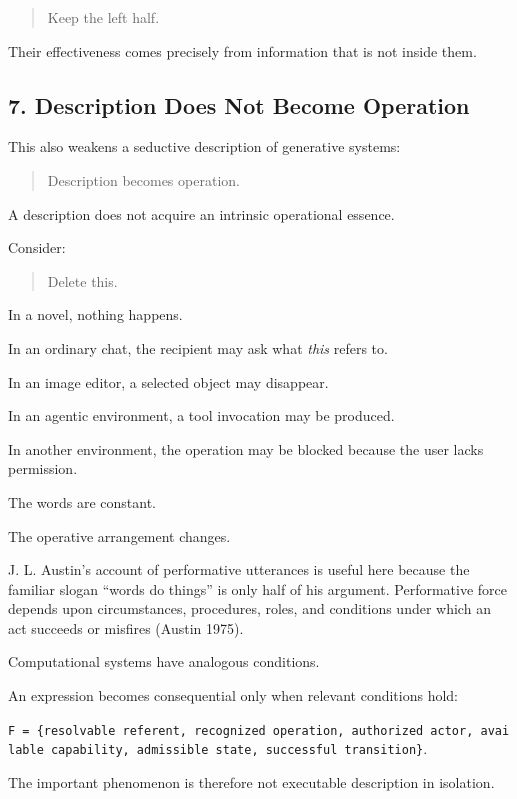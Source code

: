 \documentclass[
]{article}
\begin{document}
\begin{quote}
Keep the left half.
\end{quote}

Their effectiveness comes precisely from information that is not inside
them.

\subsection{7. Description Does Not Become
Operation}\label{description-does-not-become-operation}

This also weakens a seductive description of generative systems:

\begin{quote}
Description becomes operation.
\end{quote}

A description does not acquire an intrinsic operational essence.

Consider:

\begin{quote}
Delete this.
\end{quote}

In a novel, nothing happens.

In an ordinary chat, the recipient may ask what \emph{this} refers to.

In an image editor, a selected object may disappear.

In an agentic environment, a tool invocation may be produced.

In another environment, the operation may be blocked because the user
lacks permission.

The words are constant.

The operative arrangement changes.

J. L. Austin's account of performative utterances is useful here because
the familiar slogan ``words do things'' is only half of his argument.
Performative force depends upon circumstances, procedures, roles, and
conditions under which an act succeeds or misfires (Austin 1975).

Computational systems have analogous conditions.

An expression becomes consequential only when relevant conditions hold:

\texttt{F\ =\ \{resolvable\ referent,\ recognized\ operation,\ authorized\ actor,\ available\ capability,\ admissible\ state,\ successful\ transition\}}.

The important phenomenon is therefore not executable description in
isolation.
\end{document}
